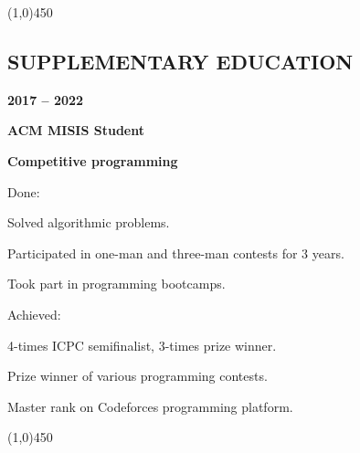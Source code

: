 \documentclass[a4paper,12pt,preview]{report}
\newcommand{\hr}{\begin{center} \line(1,0){450} \end{center}}
\begin{document}
\hr


\subsection*{SUPPLEMENTARY EDUCATION}

\begin{minipage}[c]{0.25\linewidth}
    \textbf{2017 – 2022} 
\end{minipage}
\begin{minipage}[c]{0.65\linewidth}
    \textbf{ACM MISIS Student}
    
    \textbf{Competitive programming}
\end{minipage}

\vspace{5mm} %

\begin{minipage}[c]{0.15\linewidth}
    Done:
\end{minipage}
\begin{minipage}[c]{0.75\linewidth}
	Solved algorithmic problems.
	
	Participated in one-man and three-man contests for 3 years.
	
	Took part in programming bootcamps.
\end{minipage}

\vspace{5mm} %

\begin{minipage}[c]{0.15\linewidth}
    Achieved:
\end{minipage}
\begin{minipage}[c]{0.75\linewidth}
	4-times ICPC semifinalist, 3-times prize winner.
	
	Prize winner of various programming contests.
	
	Master rank on Codeforces programming platform.
\end{minipage}

\hr 
\end{document}
